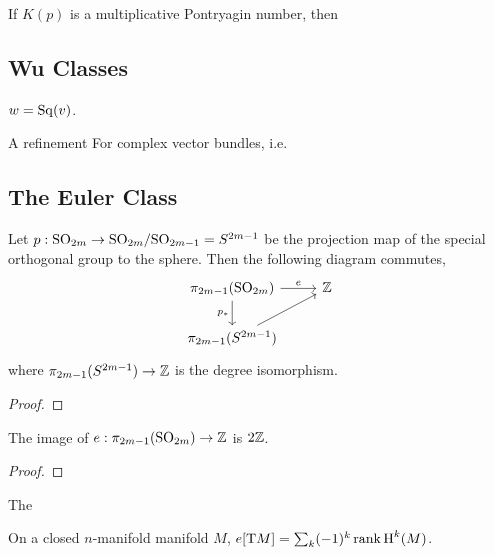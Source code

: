 \begin{corollary}
	If $K(p)$ is a multiplicative Pontryagin number, then
\end{corollary}


\subsection{Wu Classes}\label{sec:wu-classes}

\begin{theorem}
	$w=\operatorname{Sq}(v)$.
\end{theorem}

A refinement
For complex vector bundles, i.e.

\subsection{The Euler Class}\label{sec:euler-class}

\begin{theorem}\label{thm:euler-number-clutching-construction}
	Let $p : \mathrm{SO}_{2m} \to \mathrm{SO}_{2m}/\mathrm{SO}_{2m-1}= S^{2m-1}$ be the projection map of the special orthogonal group to the sphere. Then the following diagram commutes,
	\[\begin{tikzcd}
			{\pi_{2m-1}(\SO_{2m})} & \Z \\
			{\pi_{2m-1}(S^{2m-1})}
			\arrow["e", from=1-1, to=1-2]
			\arrow["{p_*}"', from=1-1, to=2-1]
			\arrow[from=2-1, to=1-2]
		\end{tikzcd}\]
	where $\pi_{2m-1}(S^{2m-1})\to \mathbb{Z}$ is the degree isomorphism.
\end{theorem}
\begin{proof}
\end{proof}

\begin{corollary}\label{cor:expressible-euler-numbers-spheres}
	The image of $e : \pi_{2m-1}(\mathrm{SO}_{2m})\to\mathbb{Z}$ is $2\mathbb{Z}$.
\end{corollary}
\begin{proof}
\end{proof}


\begin{definition}\label{def:euler-class}
	The 
\end{definition}

\begin{proposition}
	On a closed $n$-manifold manifold $M$, $e[\mathrm{T} M]=\sum_k (-1)^k \operatorname{rank} \operatorname{H}^k(M)$.
\end{proposition}

